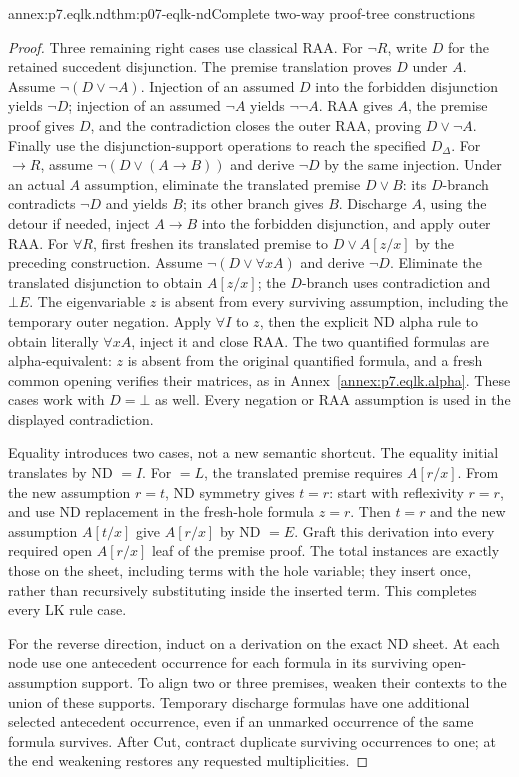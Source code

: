 \begin{annexitem}{annex:p7.eqlk.nd}{thm:p07-eqlk-nd}{Complete two-way proof-tree constructions}
\begin{proof}
Three remaining right cases use classical RAA. For \(\neg R\),
write \(D\) for the retained succedent disjunction. The premise
translation proves \(D\) under \(A\). Assume
\(\neg(D\lor\neg A)\). Injection of an assumed \(D\) into the
forbidden disjunction yields \(\neg D\); injection of an assumed
\(\neg A\) yields \(\neg\neg A\). RAA gives \(A\), the premise
proof gives \(D\), and the contradiction closes the outer RAA,
proving \(D\lor\neg A\). Finally use the disjunction-support operations
to reach the specified \(D_\Delta\).
For \(\to R\), assume \(\neg(D\lor(A\to B))\) and derive
\(\neg D\) by the same injection. Under an actual \(A\) assumption,
eliminate the translated premise \(D\lor B\): its \(D\)-branch
contradicts \(\neg D\) and yields \(B\); its other branch gives \(B\).
Discharge \(A\), using the detour if needed, inject \(A\to B\)
into the forbidden disjunction, and apply outer RAA.
For \(\forall R\), first freshen its translated premise to
\(D\lor A[z/x]\) by the preceding construction. Assume
\(\neg(D\lor\forall xA)\) and derive
\(\neg D\). Eliminate the translated disjunction to obtain
\(A[z/x]\); the \(D\)-branch uses contradiction and \(\bot E\).
The eigenvariable \(z\) is absent from every surviving assumption,
including the temporary outer negation. Apply \(\forall I\) to \(z\), then
the explicit ND alpha rule to obtain literally \(\forall xA\),
inject it and close RAA. The two quantified formulas are alpha-equivalent:
\(z\) is absent from the original quantified formula, and a fresh
common opening verifies their matrices, as in Annex~\ref{annex:p7.eqlk.alpha}.
These cases work with \(D=\bot\) as well. Every negation or RAA
assumption is used in the displayed contradiction.

Equality introduces two cases, not a new semantic shortcut. The equality
initial translates by ND \(=I\). For \(=L\), the translated premise
requires \(A[r/x]\). From the new assumption \(r=t\), ND symmetry
gives \(t=r\): start with reflexivity \(r=r\), and use ND replacement
in the fresh-hole formula \(z=r\). Then \(t=r\) and the new assumption
\(A[t/x]\) give \(A[r/x]\) by ND \(=E\). Graft this derivation
into every required open \(A[r/x]\) leaf of the premise proof. The
total instances are exactly those on the sheet, including terms with
the hole variable; they insert once, rather than recursively substituting
inside the inserted term. This completes every LK rule case.

For the reverse direction, induct on a derivation on the exact ND sheet.
At each node use one antecedent occurrence for each formula in its
surviving open-assumption support. To align two or three premises,
weaken their contexts to the union of these supports. Temporary
discharge formulas have one additional selected antecedent occurrence,
even if an unmarked occurrence of the same formula survives. After
Cut, contract duplicate surviving occurrences to one; at the end
weakening restores any requested multiplicities.


\end{proof}
\end{annexitem}
